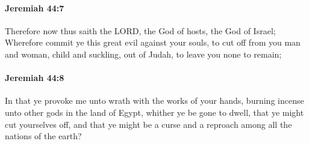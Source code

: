		\paragraph{Jeremiah 44:7} %
			\label{JEREMIAH-44-7}

			Therefore now thus saith the LORD, the God of hosts, the God of Israel; Wherefore commit ye this great evil against your souls, to cut off from you man and woman, child and suckling, out of Judah, to leave you none to remain;


		\paragraph{Jeremiah 44:8} %
			\label{JEREMIAH-44-8}

			In that ye provoke me unto wrath with the works of your hands, burning incense unto other gods in the land of Egypt, whither ye be gone to dwell, that ye might cut yourselves off, and that ye might be a curse and a reproach among all the nations of the earth?


